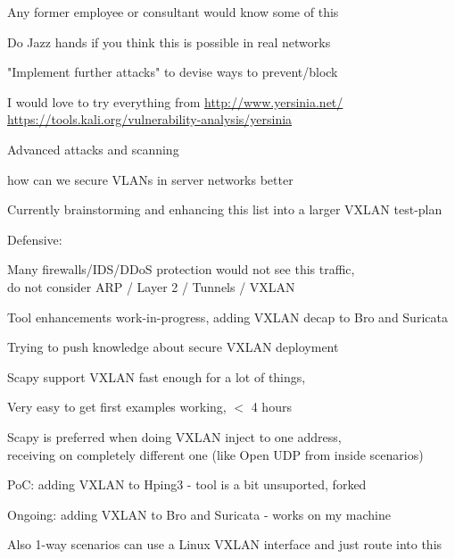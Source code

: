 \documentclass[Screen16to9,17pt,footrule]{foils}
\begin{document}
\vskip 1cm
Any former employee or consultant would know some of this

Do Jazz hands if you think this is possible in real networks




\begin{list2}
\item "Implement further attacks" to devise ways to prevent/block
\item I would love to try everything from  \url{http://www.yersinia.net/}\\ \url{https://tools.kali.org/vulnerability-analysis/yersinia}
\item Advanced attacks and scanning
\item how can we secure VLANs in server networks better
\item Currently brainstorming and enhancing this list into a larger VXLAN test-plan
\end{list2}



Defensive:
\begin{list2}
\item Many firewalls/IDS/DDoS protection would not see this traffic,\\
do not consider ARP / Layer 2 / Tunnels / VXLAN
\item Tool enhancements work-in-progress, adding VXLAN decap to Bro and Suricata
\item Trying to push knowledge about secure VXLAN deployment
\end{list2}


\begin{list2}
\item Scapy support VXLAN fast enough for a lot of things,
\item Very easy to get first examples working, $<$ 4 hours
\item Scapy is preferred when doing VXLAN inject to one address, \\
receiving on completely different one (like Open UDP from inside scenarios)
\item PoC: adding VXLAN to Hping3 - tool is a bit unsuported, forked
\item Ongoing: adding VXLAN to Bro and Suricata - works on my machine
\vskip 1cm
\item Also 1-way scenarios can use a Linux VXLAN interface and just route into this
\end{list2}
\end{document}

